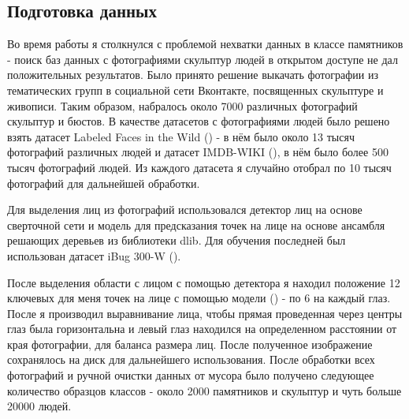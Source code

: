 \documentclass[a4paper,14pt]{extarticle}
\begin{document}
    \subsection{Подготовка данных}
    \par Во время работы я столкнулся с проблемой нехватки данных в классе памятников - поиск баз данных с фотографиями скульптур людей в открытом доступе не дал положительных результатов. Было принято решение выкачать фотографии из тематических групп в социальной сети Вконтакте, посвященных скульптуре и живописи. Таким образом, набралось около 7000 различных фотографий скульптур и бюстов. В качестве датасетов с фотографиями людей было решено взять датасет Labeled Faces in the Wild (\cite{lfw}) - в нём было около 13 тысяч фотографий различных людей и датасет IMDB-WIKI (\cite{IMDB-WIKI}), в нём было более 500 тысяч фотографий людей. Из каждого датасета я случайно отобрал по 10 тысяч фотографий для дальнейшей обработки.
    \par Для выделения лиц из фотографий использовался детектор лиц на основе сверточной сети и модель для предсказания точек на лице на основе ансамбля решающих деревьев из библиотеки dlib. Для обучения последней был использован датасет iBug 300-W (\cite{bug}).
    \par После выделения области с лицом с помощью детектора я находил положение 12 ключевых для меня точек на лице с помощью модели (\cite{align}) - по 6 на каждый глаз. После я производил выравнивание лица, чтобы прямая проведенная через центры глаз была горизонтальна и левый глаз находился на определенном расстоянии от края фотографии, для баланса размера лиц. После полученное изображение сохранялось на диск для дальнейшего использования. После обработки всех фотографий и ручной очистки данных от мусора было получено следующее количество образцов классов - около 2000 памятников и скульптур и чуть больше 20000 людей.
\end{document}
